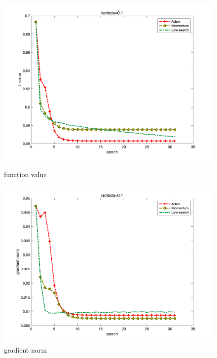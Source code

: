 \documentclass{article}
\begin{document}
\begin{figure}[H]
	\begin{minipage}{0.33\linewidth}
		\centering
		\includegraphics[width=1\linewidth]{./fig/fval_c3}
		\caption{function value}
	\end{minipage}
	\begin{minipage}{0.33\linewidth}
		\centering
		\includegraphics[width=1\linewidth]{./fig/gnorm_c3}
		\caption{gradient norm}
	\end{minipage}
	\begin{minipage}{0.33\linewidth}
		\centering

\end{minipage}
\end{figure}
\end{document}
